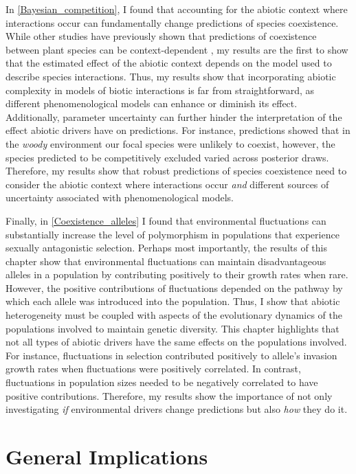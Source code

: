 \begin{refsection}
In \autoref{Bayesian_competition}, I found that accounting for the abiotic context where interactions occur can fundamentally change predictions of species coexistence. While other studies have previously shown that predictions of coexistence between plant species can be context-dependent \citep{bimler_accurate_2018,lanuza_opposing_2018}, my results are the first to show that the estimated effect of the abiotic context depends on the model used to describe species interactions. Thus, my results show that incorporating abiotic complexity in models of biotic interactions is far from straightforward, as different phenomenological models can enhance or diminish its effect. Additionally, parameter uncertainty can further hinder the interpretation of the effect abiotic drivers have on predictions. For instance, predictions showed that in the \textit{woody} environment our focal species were unlikely to coexist, however, the species predicted to be competitively excluded varied across posterior draws. Therefore, my results show that robust predictions of species coexistence need to consider the abiotic context where interactions occur \textit{and} different sources of uncertainty associated with phenomenological models.

Finally, in \autoref{Coexistence_alleles} I found that environmental fluctuations can substantially increase the level of polymorphism in populations that experience sexually antagonistic selection. Perhaps most importantly, the results of this chapter show that environmental fluctuations can maintain disadvantageous alleles in a population by contributing positively to their growth rates when rare. However, the positive contributions of fluctuations depended on the pathway by which each allele was introduced into the population. Thus, I show that abiotic heterogeneity must be coupled with aspects of the evolutionary dynamics of the populations involved to maintain genetic diversity. This chapter highlights that not all types of abiotic drivers have the same effects on the populations involved. For instance, fluctuations in selection contributed positively to allele's invasion growth rates when fluctuations were positively correlated. In contrast, fluctuations in population sizes needed to be negatively correlated to have positive contributions. Therefore, my results show the importance of not only investigating \textit{if} environmental drivers change predictions but also \textit{how} they do it.


\section*{General Implications}


\end{refsection}
